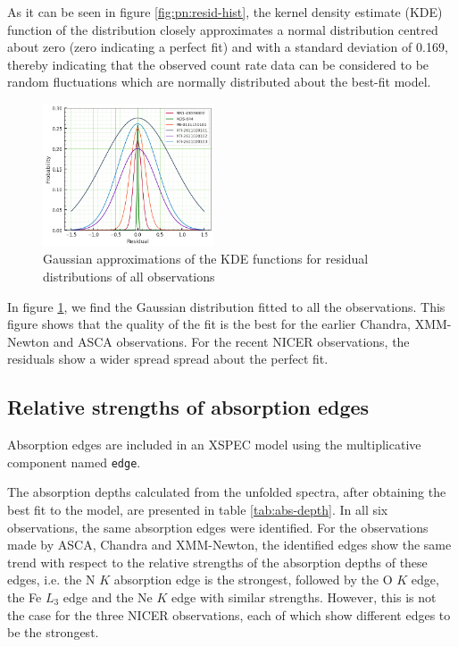     As it can be seen in figure \ref{fig:pn:resid-hist}, the kernel density estimate (KDE) function of the distribution closely approximates a normal distribution centred about zero (zero indicating a perfect fit) and with a standard deviation of 0.169, thereby indicating that the observed count rate data can be considered to be random fluctuations which are normally distributed about the best-fit model.
    
    \begin{figure}[!htb]
    	\centering
    	\includegraphics[width=0.45\textwidth]{figures/resid/mr-vel-resid-gaussfit_all-obs.png}
    	\caption{Gaussian approximations of the KDE functions for residual distributions of all observations}
    	\label{fig:all-obs:resid-gaussfit}
    \end{figure}
    
    In figure \ref{fig:all-obs:resid-gaussfit}, we find the Gaussian distribution fitted to all the observations. This figure shows that the quality of the fit is the best for the earlier Chandra, XMM-Newton and ASCA observations. For the recent NICER observations, the residuals show a wider spread spread about the perfect fit.
    
    \subsection{Relative strengths of absorption edges}
    Absorption edges are included in an XSPEC model using the multiplicative component named \texttt{edge}.
    
    The absorption depths calculated from the unfolded spectra, after obtaining the best fit to the model, are presented in table \ref{tab:abs-depth}. In all six observations, the same absorption edges were identified. For the observations made by ASCA, Chandra and XMM-Newton, the identified edges show the same trend with respect to the relative strengths of the absorption depths of these edges, i.e. the N $K$ absorption edge is the strongest, followed by the O $K$ edge, the Fe $L_3$ edge and the Ne $K$ edge with similar strengths. However, this is not the case for the three NICER observations, each of which show different edges to be the strongest.